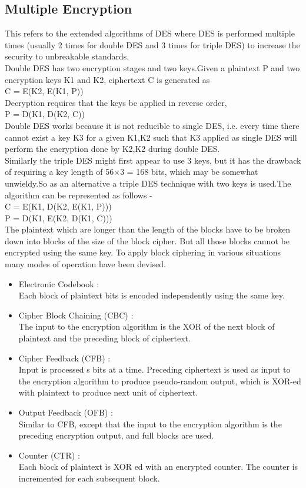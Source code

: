 \documentclass{article}
\begin{document}
\subsection{Multiple Encryption}
This refers to the extended algorithms of DES where DES is performed multiple times (usually 2 times for double DES and 3 times for triple DES) to increase the security to unbreakable standards.\\
Double DES has two encryption stages and two keys.Given a plaintext P and two encryption keys K1 and K2, ciphertext C is generated as \\
C = E(K2, E(K1, P))\\
Decryption requires that the keys be applied in reverse order,\\
P = D(K1, D(K2, C))\\
Double DES works because it is not reducible to single DES, i.e. every time there cannot exist a key K3 for a given K1,K2 such that K3 applied as single DES will perform the encryption done by K2,K2 during double DES.\\
Similarly the triple DES might first appear to use 3 keys, but it has the drawback of requiring a key length of 56$\times$3 = 168 bits, which may be somewhat unwieldy.So as an alternative a triple DES technique with two keys is used.The algorithm can be represented as follows -\\
C = E(K1, D(K2, E(K1, P))) \\
P = D(K1, E(K2, D(K1, C)))\\
The plaintext which are longer than the length of the blocks have to be broken down into blocks of the size of the block cipher. But all those blocks cannot be encrypted using the same key. To apply block ciphering in various situations many modes of operation have been devised.\\
\begin{itemize}
    \item Electronic Codebook :\\
    Each block of plaintext bits is encoded independently using the same key.
    \item Cipher Block Chaining (CBC) :\\
    The input to the encryption algorithm is the XOR of the next block of plaintext and the preceding block of ciphertext.
    \item Cipher Feedback (CFB) :\\
    Input is processed s bits at a time. Preceding ciphertext is used as input to the encryption algorithm to produce pseudo-random output, which is XOR-ed with plaintext to produce next unit of ciphertext.
    \item Output Feedback (OFB) :\\
    Similar to CFB, except that the input to the encryption algorithm is the preceding encryption output, and full blocks are used.
    \item Counter (CTR) :\\
    Each block of plaintext is XOR ed with an encrypted counter. The counter is incremented for each subsequent block.
\end{itemize}
\end{document}
